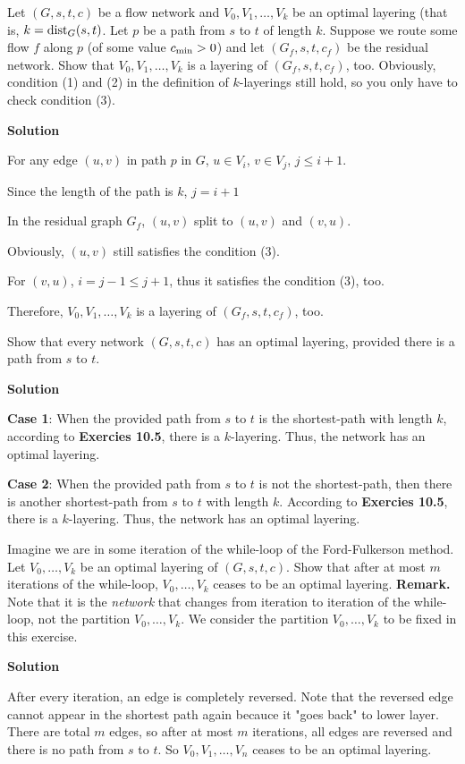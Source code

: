 
\begin{exercise}
   Let $(G,s,t,c)$ be a flow network and $V_0, V_1, \dots, V_k$ be an optimal layering
   (that is, $k = {\rm dist}_G(s,t)$.
   Let $p$ be a path from $s$ to $t$ of length $k$. 
   Suppose we route some flow $f$ along $p$ (of some
   value $c_{\rm min} > 0$) and let $(G_f,s,t,c_f)$ be the residual network. Show that
   $V_0, V_1,\dots, V_k$ is a layering of $(G_f,s,t,c_f)$, too. Obviously, condition (1) and (2) in
   the definition of $k$-layerings still hold, so you only have to check  condition (3).
\end{exercise}

\textbf{Solution}

For any edge $(u,v)$ in path $p$ in $G$, $u \in V_i$, $v \in V_j$, $j \leq i + 1$.

Since the length of the path is $k$, $j = i + 1$

In the residual graph $G_f$, $(u,v)$ split to $(u,v)$ and $(v,u)$.

Obviously, $(u,v)$ still satisfies the condition (3).

For $(v,u)$, $i = j-1 \leq j+1$, thus it satisfies the condition (3), too.

Therefore, $V_0, V_1, \dots, V_k$ is a layering of $(G_f, s, t, c_f)$, too.


\begin{exercise}
   Show that every network $(G,s,t,c)$ has an optimal layering, provided there is a path
   from $s$ to $t$.
\end{exercise}

\textbf{Solution}

\textbf{Case 1}: When the provided path from $s$ to $t$ is the shortest-path with length $k$, according to \textbf{Exercies 10.5}, there is a $k$-layering. Thus, the network has an optimal layering.

\textbf{Case 2}: When the provided path from $s$ to $t$ is not the shortest-path, then there is another shortest-path from $s$ to $t$ with length $k$. According to \textbf{Exercies 10.5}, there is a $k$-layering. Thus, the network has an optimal layering.


\begin{exercise}
   Imagine we are in some iteration of the while-loop of the Ford-Fulkerson method.
   Let $V_0, \dots, V_k$ be an optimal layering of $(G,s,t,c)$. Show that after at most $m$
   iterations of the while-loop, $V_0,\dots,V_k$ ceases
   to be an optimal layering. \textbf{Remark.} Note that it is the {\em network} that changes from
   iteration to iteration of the while-loop, not the partition $V_0,\dots,V_k$. We consider
   the partition $V_0,\dots,V_k$ to be fixed in this exercise.
\end{exercise}

\textbf{Solution}

After every iteration, an edge is completely reversed. Note that the reversed edge cannot appear in the shortest path again becauce it "goes back" to lower layer.
There are total $m$ edges, so after at most $m$ iterations, all edges are reversed and there is no path from $s$ to $t$. So $V_0, V_1, \dots, V_n$ ceases to be an optimal layering.
